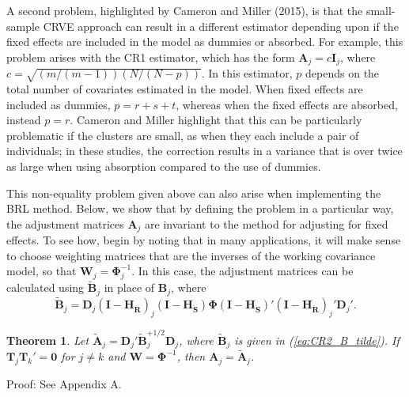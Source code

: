 \documentclass[12pt]{article}
\newtheorem{thm}{Theorem}
\newcommand{\bm}{\mathbf}
\newcommand{\bs}{\boldsymbol}
\begin{document}
A second problem, highlighted by Cameron and Miller (2015), is that the small-sample CRVE approach can result in a different estimator depending upon if the fixed effects are included in the model as dummies or absorbed. 
For example, this problem arises with the CR1 estimator, which has the form $\bm{A}_j = c\bm{I}_j$, where $c = \sqrt{(m/(m-1))(N/(N - p))}$. In this estimator, $p$ depends on the total number of covariates estimated in the model.
When fixed effects are included as dummies, $p = r + s + t$, whereas when the fixed effects are absorbed, instead $p = r$. 
Cameron and Miller highlight that this can be particularly problematic if the clusters are small, as when they each include a pair of individuals; in these studies, the correction results in a variance that is over twice as large when using absorption compared to the use of dummies.

This non-equality problem given above can also arise when implementing the BRL method. 
Below, we show that by defining the problem in a particular way, the adjustment matrices $\bm{A}_j$ are invariant to the method for adjusting for fixed effects.
To see how, begin by noting that in many applications, it will make sense to choose weighting matrices that are the inverses of the working covariance model, so that $\bm{W}_j = \bs\Phi_j^{-1}$. In this case, the adjustment matrices can be calculated using $\bm{\tilde{B}}_j$ in place of $\bm{B}_j$, where
\begin{equation}
\label{eq:CR2_B_tilde}
\bm{\tilde{B}}_j = \bm{D}_j\left(\bm{I} - \bm{H_{\ddot{R}}}\right)_j \left(\bm{I} - \bm{H_{\ddot{S}}}\right) \bs\Phi \left(\bm{I} - \bm{H_{\ddot{S}}}\right)' \left(\bm{I} - \bm{H_{\ddot{R}}}\right)_j' \bm{D}_j'.
\end{equation}

\begin{thm}
\label{thm:absorb}
Let $\bm{\tilde{A}}_j = \bm{D}_j'\bm{\tilde{B}}_j^{+1/2} \bm{D}_j$, where $\bm{\tilde{B}}_j$ is given in (\ref{eq:CR2_B_tilde}). If $\bm{T}_j \bm{T}_k' = \bm{0}$ for $j \neq k$ and $\bm{W} = \bs\Phi^{-1}$, then $\bm{A}_j = \bm{\tilde{A}}_j$. 
\end{thm}
Proof: See Appendix A.
\end{document}
